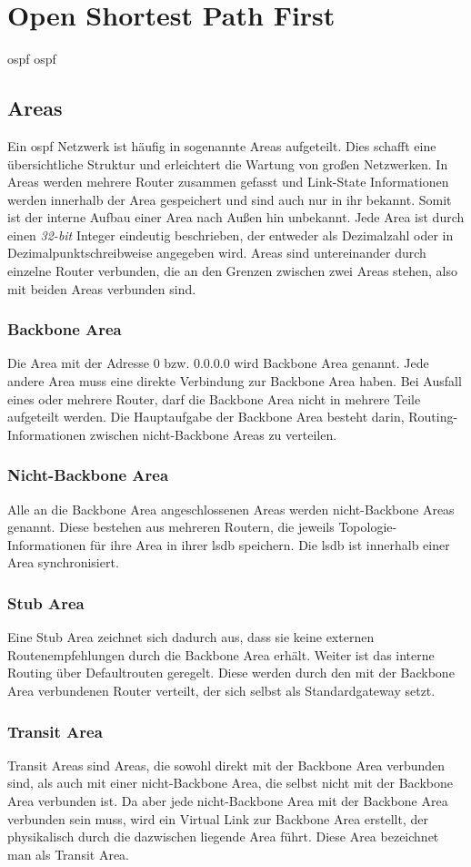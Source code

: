 \documentclass[11pt,a4paper,final]{article}
\begin{document}
\section{Open Shortest Path First}
\ac{ospf} \ac{ospf}
\subsection{Areas}
Ein \ac{ospf} Netzwerk ist häufig in sogenannte Areas aufgeteilt.
Dies schafft eine übersichtliche Struktur und erleichtert die Wartung von großen Netzwerken. In Areas werden mehrere Router zusammen gefasst und Link-State Informationen werden innerhalb der Area gespeichert und sind auch nur in ihr bekannt.
Somit ist der interne Aufbau einer Area nach Außen hin unbekannt.
Jede Area ist durch einen \textit{32-bit} Integer eindeutig beschrieben, der entweder als Dezimalzahl oder in Dezimalpunktschreibweise angegeben wird.
Areas sind untereinander durch einzelne Router verbunden, die an den Grenzen zwischen zwei Areas stehen, also mit beiden Areas verbunden sind.
\subsubsection{Backbone Area}
Die Area mit der Adresse 0 bzw. 0.0.0.0 wird Backbone Area genannt.
Jede andere Area muss eine direkte Verbindung zur Backbone Area haben.
Bei Ausfall eines oder mehrere Router, darf die Backbone Area nicht in mehrere Teile aufgeteilt werden.
Die Hauptaufgabe der Backbone Area besteht darin, Routing-Informationen zwischen nicht-Backbone Areas zu verteilen.
\subsubsection{Nicht-Backbone Area}
Alle an die Backbone Area angeschlossenen Areas werden nicht-Backbone Areas genannt.
Diese bestehen aus mehreren Routern, die jeweils Topologie-Informationen für ihre Area in ihrer \ac{lsdb} speichern.
Die \ac{lsdb} ist innerhalb einer Area synchronisiert.
\subsubsection{Stub Area}
Eine Stub Area zeichnet sich dadurch aus, dass sie keine externen Routenempfehlungen durch die Backbone Area erhält.
Weiter ist das interne Routing über Defaultrouten geregelt. Diese werden durch den mit der Backbone Area verbundenen Router verteilt, der sich selbst als Standardgateway setzt.
\subsubsection{Transit Area}
Transit Areas sind Areas, die sowohl direkt mit der Backbone Area verbunden sind, als auch mit einer nicht-Backbone Area, die selbst nicht mit der Backbone Area verbunden ist.
Da aber jede nicht-Backbone Area mit der Backbone Area verbunden sein muss, wird ein Virtual Link zur Backbone Area erstellt, der physikalisch durch die dazwischen liegende Area führt.
Diese Area bezeichnet man als Transit Area.
\end{document}
